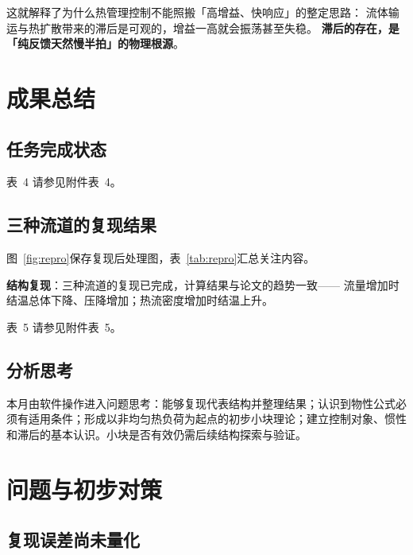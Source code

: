 \documentclass[stage1,fontset=fandol]{ydzjreport}
\makeatletter
\newcommand{\submissionnumber}[1]{\def\@currentlabel{#1}}
\makeatother
\begin{document}
	这就解释了为什么热管理控制不能照搬「高增益、快响应」的整定思路：
	流体输运与热扩散带来的滞后是可观的，增益一高就会振荡甚至失稳。
	\textbf{滞后的存在，是「纯反馈天然慢半拍」的物理根源}。

\section{成果总结}

\subsection{任务完成状态}


\par\noindent \begingroup\submissionnumber{4}\label{tab:tasks}\endgroup 表~4 请参见附件表~4。\par


\subsection{三种流道的复现结果}

图~\ref{fig:repro}保存复现后处理图，表~\ref{tab:repro}汇总关注内容。

	\textbf{结构复现}：三种流道的复现已完成，计算结果与论文的趋势一致——
	流量增加时结温总体下降、压降增加；热流密度增加时结温上升。


\par\noindent \begingroup\submissionnumber{5}\label{tab:repro}\endgroup 表~5 请参见附件表~5。\par




\subsection{分析思考}

本月由软件操作进入问题思考：能够复现代表结构并整理结果；认识到物性公式必须有适用条件；形成以非均匀热负荷为起点的初步小块理论；建立控制对象、惯性和滞后的基本认识。小块是否有效仍需后续结构探索与验证。

\section{问题与初步对策}

\subsection{复现误差尚未量化}
\end{document}
